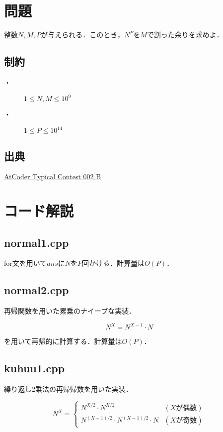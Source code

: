 \documentclass[slide,20pt]{ltjsarticle}
\begin{document}
\section*{問題}
整数$N, M, P$が与えられる．このとき，$N ^ P$を$M$で割った余りを求めよ．

\subsection*{制約}
\begin{description}
\item[・] $1 \leq N, M \leq 10^9$
\item[・] $1 \le P \le 10^{14}$
\end{description}

\subsection*{出典}
\href{https://atcoder.jp/contests/atc002/tasks/atc002_b}{AtCoder Typical Contest 002 B}


\section*{コード解説}
\subsection*{normal1.cpp}
for文を用いて$ans$に$N$を$P$回かける．計算量は$O(P)$．



\newpage
\subsection*{normal2.cpp}
再帰関数を用いた累乗のナイーブな実装．

\[ N ^ X = N ^ {X - 1} \cdot N \]

を用いて再帰的に計算する．計算量は$O(P)$．



\newpage

\subsection*{kuhuu1.cpp}
繰り返し$2$乗法の再帰帰数を用いた実装．

\begin{equation*}
  N ^ X = \left\{
    \begin{array}{ll}
      N ^ {X / 2} \cdot N ^ {X / 2} & (X \text{が偶数}) \\
      N ^ {(X - 1) / 2} \cdot N ^ {(X - 1) / 2} \cdot N & (X \text{が奇数})
    \end{array}
  \right.
\end{equation*}
\end{document}

